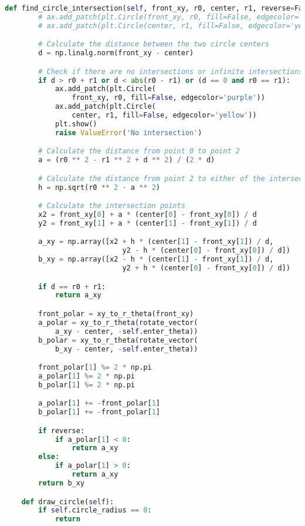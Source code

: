 \begin{lstlisting}[language=python]
    def find_circle_intersection(self, front_xy, r0, center, r1, reverse=False) -> np.array:
        # ax.add_patch(plt.Circle(front_xy, r0, fill=False, edgecolor='purple'))
        # ax.add_patch(plt.Circle(center, r1, fill=False, edgecolor='yellow'))

        # Calculate the distance between the two circle centers
        d = np.linalg.norm(front_xy - center)

        # Check if there are no intersections or infinite intersections
        if d > r0 + r1 or d < abs(r0 - r1) or (d == 0 and r0 == r1):
            ax.add_patch(plt.Circle(
                front_xy, r0, fill=False, edgecolor='purple'))
            ax.add_patch(plt.Circle(
                center, r1, fill=False, edgecolor='yellow'))
            plt.show()
            raise ValueError('No intersection')

        # Calculate the distance from point 0 to point 2
        a = (r0 ** 2 - r1 ** 2 + d ** 2) / (2 * d)

        # Calculate the distance from point 2 to either of the intersection points
        h = np.sqrt(r0 ** 2 - a ** 2)

        # Calculate the intersection points
        x2 = front_xy[0] + a * (center[0] - front_xy[0]) / d
        y2 = front_xy[1] + a * (center[1] - front_xy[1]) / d

        a_xy = np.array([x2 + h * (center[1] - front_xy[1]) / d,
                            y2 - h * (center[0] - front_xy[0]) / d])
        b_xy = np.array([x2 - h * (center[1] - front_xy[1]) / d,
                            y2 + h * (center[0] - front_xy[0]) / d])

        if d == r0 + r1:
            return a_xy

        front_polar = xy_to_r_theta(front_xy)
        a_polar = xy_to_r_theta(rotate_vector(
            a_xy - center, -self.enter_theta))
        b_polar = xy_to_r_theta(rotate_vector(
            b_xy - center, -self.enter_theta))

        front_polar[1] %= 2 * np.pi
        a_polar[1] %= 2 * np.pi
        b_polar[1] %= 2 * np.pi

        a_polar[1] += -front_polar[1]
        b_polar[1] += -front_polar[1]

        if reverse:
            if a_polar[1] < 0:
                return a_xy
        else:
            if a_polar[1] > 0:
                return a_xy
        return b_xy

    def draw_circle(self):
        if self.circle_radius == 0:
            return


\end{lstlisting}
